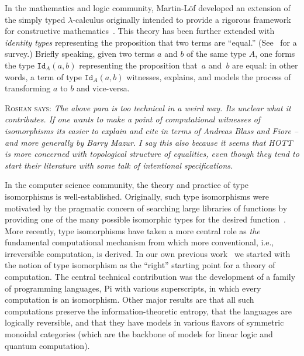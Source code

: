 \documentclass{llncs}
\newcommand{\roshan}[1]{\textsc{Roshan says:} 
  \textit{#1}
}
\begin{document}
In the mathematics and logic community, Martin-L\"of developed an extension
of the simply typed $\lambda$-calculus originally intended to provide a
rigorous framework for constructive
mathematics~\cite{citeulike:7374951}. This theory has been further extended
with \emph{identity types} representing the proposition that two terms are
``equal.'' (See~\cite{streicher,warren} for a survey.) Briefly speaking,
given two terms $a$ and $b$ of the same type $A$, one forms the type
$\texttt{Id}_A(a,b)$ representing the proposition that~$a$ and~$b$ are equal:
in other words, a term of type $\texttt{Id}_A(a,b)$ witnesses, explains, and
models the process of transforming $a$ to $b$ and vice-versa.

\roshan{The above para is too technical in a weird way. Its unclear
  what it contributes. If one wants to make a point of computational
  witnesses of isomorphisms its easier to explain and cite in terms of
  Andreas Blass and Fiore -- and more generally by Barry Mazur. I say
  this also because it seems that HOTT is more concerned with
  topological structure of equalities, even though they tend to start
  their literature with some talk of intentional specifications.}

In the computer science community, the theory and practice of type
isomorphisms is well-established. Originally, such type isomorphisms were
motivated by the pragmatic concern of searching large libraries of functions
by providing one of the many possible isomorphic types for the desired
function~\cite{Rittri:1989:UTS:99370.99384}. More recently, type isomorphisms
have taken a more central role as \emph{the} fundamental computational
mechanism from which more conventional, i.e., irreversible computation, is
derived. In our own previous
work~\cite{James:2012:IE:2103656.2103667,rc2011,rc2012} we started with the
notion of type isomorphism as the ``right'' starting point for a theory of
computation. The central technical contribution was the development of a
family of programming languages, {{Pi}} with various superscripts, in which
every computation is an isomorphism. Other major results are that all such
computations preserve the information-theoretic entropy, that the languages
are logically reversible, and that they have models in various flavors of
symmetric monoidal categories (which are the backbone of models for linear
logic and quantum computation). 
\end{document}

